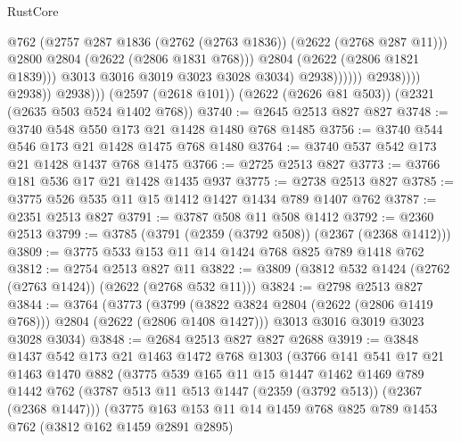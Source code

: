 \begin{lexlean}{RustCore}
\begin{coremodule}
                                        @762
                                        (@2757
                                          @287
                                          @1836
                                          (@2762 (@2763 @1836))
                                          (@2622 (@2768 @287 @11)))
                                        @2800
                                        @2804
                                        (@2622 (@2806 @1831 @768)))
                                      @2804
                                      (@2622 (@2806 @1821 @1839)))
                                    @3013
                                    @3016
                                    @3019
                                    @3023
                                    @3028
                                    @3034)
                                  @2938))))))
                      @2938))))
              @2938))
          @2938)))
    (@2597 (@2618 @101))
    (@2622 (@2626 @81 @503))
    (@2321 (@2635 @503 @524 @1402 @768))
@3740 := @2645 @2513 @827 @827
@3748 := @3740 @548 @550 @173 @21 @1428 @1480 @768 @1485
@3756 := @3740 @544 @546 @173 @21 @1428 @1475 @768 @1480
@3764 := @3740 @537 @542 @173 @21 @1428 @1437 @768 @1475
@3766 := @2725 @2513 @827
@3773 := @3766 @181 @536 @17 @21 @1428 @1435 @937
@3775 := @2738 @2513 @827
@3785 := @3775 @526 @535 @11 @15 @1412 @1427 @1434 @789 @1407 @762
@3787 := @2351 @2513 @827
@3791 := @3787 @508 @11 @508 @1412
@3792 := @2360 @2513
@3799 := @3785 (@3791 (@2359 (@3792 @508)) (@2367 (@2368 @1412)))
@3809 := @3775 @533 @153 @11 @14 @1424 @768 @825 @789 @1418 @762
@3812 := @2754 @2513 @827 @11
@3822 := @3809 (@3812 @532 @1424 (@2762 (@2763 @1424)) (@2622 (@2768 @532 @11)))
@3824 := @2798 @2513 @827
@3844 := @3764
    (@3773
      (@3799 (@3822 @3824 @2804 (@2622 (@2806 @1419 @768))) @2804 (@2622 (@2806 @1408 @1427)))
      @3013
      @3016
      @3019
      @3023
      @3028
      @3034)
@3848 := @2684 @2513 @827 @827 @2688
@3919 := @3848
    @1437
    @542
    @173
    @21
    @1463
    @1472
    @768
    @1303
    (@3766
      @141
      @541
      @17
      @21
      @1463
      @1470
      @882
      (@3775
        @539
        @165
        @11
        @15
        @1447
        @1462
        @1469
        @789
        @1442
        @762
        (@3787 @513 @11 @513 @1447 (@2359 (@3792 @513)) (@2367 (@2368 @1447)))
        (@3775
          @163
          @153
          @11
          @14
          @1459
          @768
          @825
          @789
          @1453
          @762
          (@3812 @162 @1459 @2891 @2895)

\end{coremodule}
\end{lexlean}
